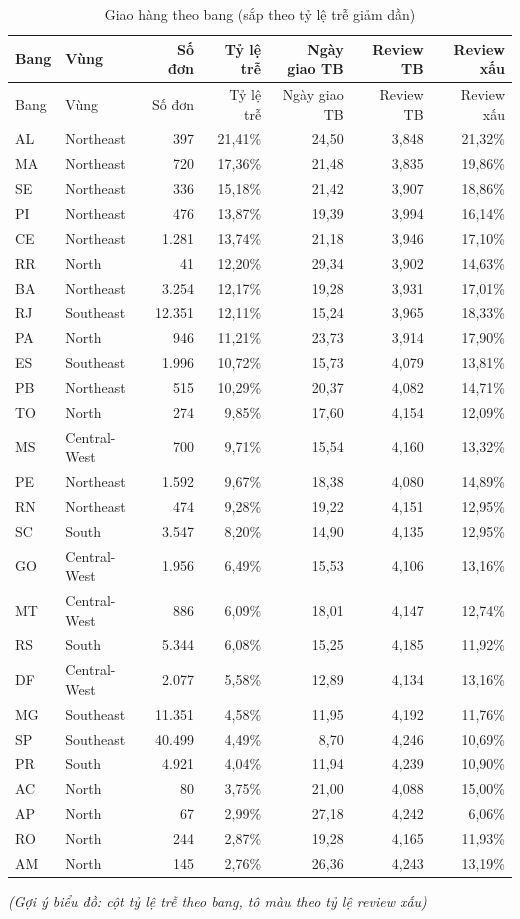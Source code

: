 \documentclass[12pt,a4paper]{report}
\newcommand{\bieudo}[1]{\par{\small\textit{(Gợi ý biểu đồ: #1)}}\par}
\renewcommand{\_}{\oldunderscore\allowbreak}
\begin{document}
\begingroup\small
\begin{longtable}{llrrrrr}
\caption{Giao hàng theo bang (sắp theo tỷ lệ trễ giảm dần)}\label{tab:states}\\
\toprule
Bang & Vùng & Số đơn & Tỷ lệ trễ & Ngày giao TB & Review TB & Review xấu \\
\midrule\endfirsthead
\toprule
Bang & Vùng & Số đơn & Tỷ lệ trễ & Ngày giao TB & Review TB & Review xấu \\
\midrule\endhead
AL & Northeast & 397 & 21,41\% & 24,50 & 3,848 & 21,32\% \\
MA & Northeast & 720 & 17,36\% & 21,48 & 3,835 & 19,86\% \\
SE & Northeast & 336 & 15,18\% & 21,42 & 3,907 & 18,86\% \\
PI & Northeast & 476 & 13,87\% & 19,39 & 3,994 & 16,14\% \\
CE & Northeast & 1.281 & 13,74\% & 21,18 & 3,946 & 17,10\% \\
RR & North & 41 & 12,20\% & 29,34 & 3,902 & 14,63\% \\
BA & Northeast & 3.254 & 12,17\% & 19,28 & 3,931 & 17,01\% \\
RJ & Southeast & 12.351 & 12,11\% & 15,24 & 3,965 & 18,33\% \\
PA & North & 946 & 11,21\% & 23,73 & 3,914 & 17,90\% \\
ES & Southeast & 1.996 & 10,72\% & 15,73 & 4,079 & 13,81\% \\
PB & Northeast & 515 & 10,29\% & 20,37 & 4,082 & 14,71\% \\
TO & North & 274 & 9,85\% & 17,60 & 4,154 & 12,09\% \\
MS & Central-West & 700 & 9,71\% & 15,54 & 4,160 & 13,32\% \\
PE & Northeast & 1.592 & 9,67\% & 18,38 & 4,080 & 14,89\% \\
RN & Northeast & 474 & 9,28\% & 19,22 & 4,151 & 12,95\% \\
SC & South & 3.547 & 8,20\% & 14,90 & 4,135 & 12,95\% \\
GO & Central-West & 1.956 & 6,49\% & 15,53 & 4,106 & 13,16\% \\
MT & Central-West & 886 & 6,09\% & 18,01 & 4,147 & 12,74\% \\
RS & South & 5.344 & 6,08\% & 15,25 & 4,185 & 11,92\% \\
DF & Central-West & 2.077 & 5,58\% & 12,89 & 4,134 & 13,16\% \\
MG & Southeast & 11.351 & 4,58\% & 11,95 & 4,192 & 11,76\% \\
SP & Southeast & 40.499 & 4,49\% & 8,70 & 4,246 & 10,69\% \\
PR & South & 4.921 & 4,04\% & 11,94 & 4,239 & 10,90\% \\
AC & North & 80 & 3,75\% & 21,00 & 4,088 & 15,00\% \\
AP & North & 67 & 2,99\% & 27,18 & 4,242 & 6,06\% \\
RO & North & 244 & 2,87\% & 19,28 & 4,165 & 11,93\% \\
AM & North & 145 & 2,76\% & 26,36 & 4,243 & 13,19\% \\
\bottomrule
\end{longtable}
\endgroup
\bieudo{cột tỷ lệ trễ theo bang, tô màu theo tỷ lệ review xấu}
\end{document}
